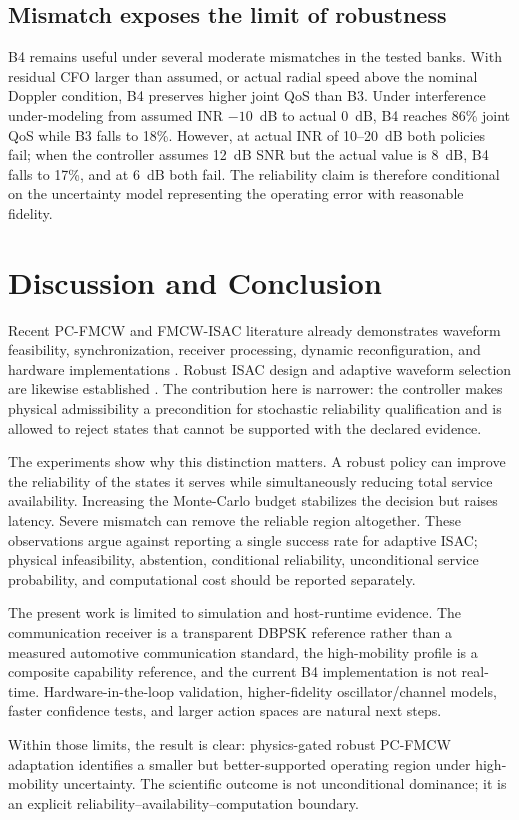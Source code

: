 \documentclass[conference,a4paper]{IEEEtran}
\begin{document}
\radarconfEvidenceTable

\subsection{Mismatch exposes the limit of robustness}

B4 remains useful under several moderate mismatches in the tested banks. With residual CFO larger than assumed, or actual radial speed above the nominal Doppler condition, B4 preserves higher joint QoS than B3. Under interference under-modeling from assumed INR $-10$~dB to actual 0~dB, B4 reaches 86\% joint QoS while B3 falls to 18\%. However, at actual INR of 10--20~dB both policies fail; when the controller assumes 12~dB SNR but the actual value is 8~dB, B4 falls to 17\%, and at 6~dB both fail. The reliability claim is therefore conditional on the uncertainty model representing the operating error with reasonable fidelity.

\section{Discussion and Conclusion}

Recent PC-FMCW and FMCW-ISAC literature already demonstrates waveform feasibility, synchronization, receiver processing, dynamic reconfiguration, and hardware implementations \cite{alamieldine2024chirpseq,alamieldine2026sync,temiz2026tcomm}. Robust ISAC design and adaptive waveform selection are likewise established \cite{wang2024robustwaveform,yazar2026adaptive}. The contribution here is narrower: the controller makes physical admissibility a precondition for stochastic reliability qualification and is allowed to reject states that cannot be supported with the declared evidence.

The experiments show why this distinction matters. A robust policy can improve the reliability of the states it serves while simultaneously reducing total service availability. Increasing the Monte-Carlo budget stabilizes the decision but raises latency. Severe mismatch can remove the reliable region altogether. These observations argue against reporting a single success rate for adaptive ISAC; physical infeasibility, abstention, conditional reliability, unconditional service probability, and computational cost should be reported separately.

The present work is limited to simulation and host-runtime evidence. The communication receiver is a transparent DBPSK reference rather than a measured automotive communication standard, the high-mobility profile is a composite capability reference, and the current B4 implementation is not real-time. Hardware-in-the-loop validation, higher-fidelity oscillator/channel models, faster confidence tests, and larger action spaces are natural next steps.

Within those limits, the result is clear: physics-gated robust PC-FMCW adaptation identifies a smaller but better-supported operating region under high-mobility uncertainty. The scientific outcome is not unconditional dominance; it is an explicit reliability--availability--computation boundary.



\end{document}
